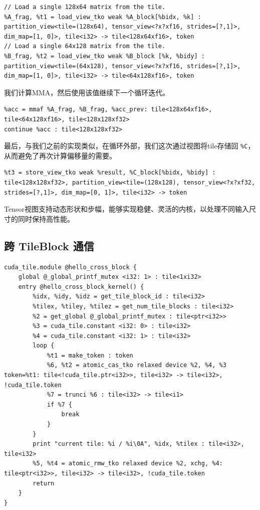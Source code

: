 \documentclass{article}
\begin{document}
\begin{lstlisting}
// Load a single 128x64 matrix from the tile.
%A_frag, %t1 = load_view_tko weak %A_block[%bidx, %k] : partition_view<tile=(128x64), tensor_view<?x?xf16, strides=[?,1]>, dim_map=[1, 0]>, tile<i32> -> tile<128x64xf16>, token
// Load a single 64x128 matrix from the tile.
%B_frag, %t2 = load_view_tko weak %B_block [%k, %bidy] : partition_view<tile=(64x128), tensor_view<?x?xf16, strides=[?,1]>, dim_map=[1, 0]>, tile<i32> -> tile<64x128xf16>, token
\end{lstlisting}

我们计算MMA，然后使用该值继续下一个循环迭代。


\begin{lstlisting}
%acc = mmaf %A_frag, %B_frag, %acc_prev: tile<128x64xf16>, tile<64x128xf16>, tile<128x128xf32>
continue %acc : tile<128x128xf32>
\end{lstlisting}

最后，与我们之前的实现类似，在循环外部，我们这次通过视图将tile存储回 \texttt{\%C}，从而避免了再次计算偏移量的需要。


\begin{lstlisting}
%t3 = store_view_tko weak %result, %C_block[%bidx, %bidy] : tile<128x128xf32>, partition_view<tile=(128x128), tensor_view<?x?xf32, strides=[?,1]>, dim_map=[0, 1]>, tile<i32> -> token
\end{lstlisting}

Tensor视图支持动态形状和步幅，能够实现稳健、灵活的内核，以处理不同输入尺寸的同时保持高性能。



\subsection{跨 TileBlock 通信}

\begin{lstlisting}
cuda_tile.module @hello_cross_block {
    global @_global_printf_mutex <i32: 1> : tile<1xi32>
    entry @hello_cross_block_kernel() {
        %idx, %idy, %idz = get_tile_block_id : tile<i32>
        %tilex, %tiley, %tilez = get_num_tile_blocks : tile<i32>
        %2 = get_global @_global_printf_mutex : tile<ptr<i32>>
        %3 = cuda_tile.constant <i32: 0> : tile<i32>
        %4 = cuda_tile.constant <i32: 1> : tile<i32>
        loop {
            %t1 = make_token : token
            %6, %t2 = atomic_cas_tko relaxed device %2, %4, %3 token=%t1: tile<!cuda_tile.ptr<i32>>, tile<i32> -> tile<i32>, !cuda_tile.token
            %7 = trunci %6 : tile<i32> -> tile<i1>
            if %7 {
                break
            }
        }
        print "current tile: %i / %i\0A", %idx, %tilex : tile<i32>, tile<i32>
        %5, %t4 = atomic_rmw_tko relaxed device %2, xchg, %4: tile<ptr<i32>>, tile<i32> -> tile<i32>, !cuda_tile.token
        return
    }
}
\end{lstlisting}
\end{document}
